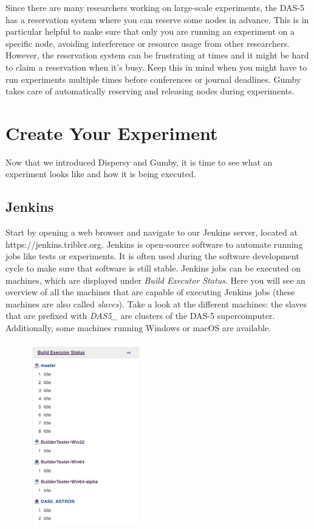 \documentclass{article}
\begin{document}
Since there are many researchers working on large-scale experiments, the DAS-5 has a reservation system where you can reserve some nodes in advance.
This is in particular helpful to make sure that only you are running an experiment on a specific node, avoiding interference or resource usage from other researchers.
However, the reservation system can be frustrating at times and it might be hard to claim a reservation when it's busy.
Keep this in mind when you might have to run experiments multiple times before conferences or journal deadlines.
Gumby takes care of automatically reserving and releasing nodes during experiments.

\section{Create Your Experiment}
\label{sec:create_experiment}
Now that we introduced Dispersy and Gumby, it is time to see what an experiment looks like and how it is being executed.

\subsection{Jenkins}
\label{sec:create_experiment_jenkins}
Start by opening a web browser and navigate to our Jenkins server, located at https://jenkins.tribler.org.
Jenkins is open-source software to automate running jobs like tests or experiments.
It is often used during the software development cycle to make sure that software is still stable.
Jenkins jobs can be executed on machines, which are displayed under \emph{Build Executor Status}.
Here you will see an overview of all the machines that are capable of executing Jenkins jobs (these machines are also called \emph{slaves}).
Take a look at the different machines: the slaves that are prefixed with \emph{DAS5\_} are clusters of the DAS-5 supercomputer.
Additionally, some machines running Windows or macOS are available.

\begin{figure}[h!]
	\centering
	\includegraphics[width=5cm]{jenkins_slaves.png}
\end{figure}
\end{document}

